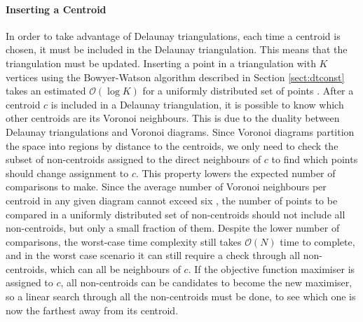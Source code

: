 \paragraph{Inserting a Centroid}
In order to take advantage of Delaunay triangulations, each time a centroid is chosen, it must be included in the Delaunay triangulation. This means that the triangulation must be updated. Inserting a point in a triangulation with $K$ vertices using the Bowyer-Watson algorithm described in Section \ref{sect:dtconst} takes an estimated $\mathcal{O}(\log{K})$ for a uniformly distributed set of points \cite{tricomplex}.
After a centroid $c$ is included in a Delaunay triangulation, it is possible to know which other centroids are its Voronoi neighbours. This is due to the duality between Delaunay triangulations and Voronoi diagrams.
Since Voronoi diagrams partition the space into regions by distance to the centroids, we only need to check the subset of non-centroids assigned to the direct neighbours of $c$ to find which points should change assignment to $c$. 
This property lowers the expected number of comparisons to make. Since the average number of Voronoi neighbours per centroid in any given diagram cannot exceed six \cite{tricard2,tricard1}, the number of points to be compared in a uniformly distributed set of non-centroids should not include all non-centroids, but only a small fraction of them.
Despite the lower number of comparisons, the worst-case time complexity still takes $\mathcal{O}(N)$ time to complete, and in the worst case scenario it can still require a check through all non-centroids, which can all be neighbours of $c$.
If the objective function maximiser is assigned to $c$, all non-centroids can be candidates to become the new maximiser, so a linear search through all the non-centroids must be done, to see which one is now the farthest away from its centroid.

